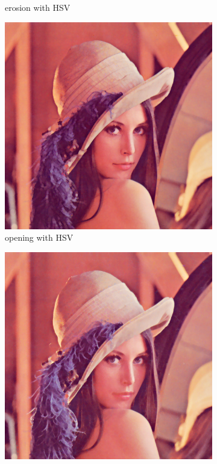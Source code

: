 \begin{figure}[!ht]
\begin{subfigure}[t]{0.22\textwidth}
    \caption{erosion with HSV}
    \centering
  \end{subfigure}
\begin{subfigure}[t]{0.22\textwidth}
    \includegraphics[width=0.9\linewidth]{../project/images/outputs/compare_order/opening_HSV.png}
    \caption{opening with HSV}
    \centering
  \end{subfigure}
\begin{subfigure}[t]{0.22\textwidth}
    \includegraphics[width=0.9\linewidth]{../project/images/outputs/compare_order/closing_HSV.png}

\end{subfigure}
\end{figure}
